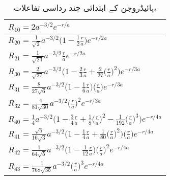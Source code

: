 \begin{table}
\caption{ہائیڈروجن کے ابتدائی چند رداسی تفاعلات، }
\label{جدول_ابعادی_ہائیڈروجن_رداسی_تفاعل}
\centering
\renewcommand{\arraystretch}{2}
\begin{tabular}{l}
\toprule
$R_{10}=2a^{-3/2}e^{-r/a}$\\
\midrule
$R_{20}=\frac{1}{\sqrt{2}}a^{-3/2}\big(1-\frac{1}{2}\frac{r}{a}\big)e^{-r/2a}$\\
$R_{21}=\frac{1}{\sqrt{24}}a^{-3/2}\frac{r}{a}e^{-r/2a}$\\
\midrule
$R_{30}=\frac{2}{\sqrt{27}}a^{-3/2}\big(1-\frac{2}{3}\frac{r}{a}+\frac{2}{27}\big(\frac{r}{a}\big)^2\big)e^{-r/3a}$\\
$R_{31}=\frac{8}{27\sqrt{6}}a^{-3/2}\big(1-\frac{1}{6}\frac{r}{a}\big)\big(\frac{r}{a}\big)e^{-r/3a}$\\
$R_{32}=\frac{4}{81\sqrt{30}}a^{-3/2}\big(\frac{r}{a}\big)^2e^{-r/3a}$\\
\midrule
$R_{40}=\frac{1}{4}a^{-3/2}\big(1-\frac{3}{4}\frac{r}{a}+\frac{1}{8}\big(\frac{r}{a}\big)^2-\frac{1}{192}\big(\frac{r}{a}\big)^3\big)e^{-r/4a}$\\
$R_{41}=\frac{\sqrt{5}}{16\sqrt{3}}a^{-3/2}\big(1-\frac{1}{4}\frac{r}{a}+\frac{1}{80}\big(\frac{r}{a}\big)^2\big)\big(\frac{r}{a}\big)e^{-r/4a}$\\
$R_{42}=\frac{1}{64\sqrt{5}}a^{-3/2}\big(1-\frac{1}{12}\frac{r}{a}\big)\big(\frac{r}{a}\big)^2e^{-r/4a}$\\
$R_{43}=\frac{1}{768\sqrt{35}}a^{-3/2}\big(\frac{r}{a}\big)^3e^{-r/4a}$\\
\bottomrule
\end{tabular}
\end{table}
%
